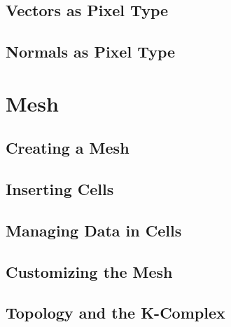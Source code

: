 




\subsection{Vectors as Pixel Type}
\label{sec:PointSetWithVectorsAsPixelType}





\subsection{Normals as Pixel Type}
\label{sec:PointSetWithCovariantVectorsAsPixelType}






\section{Mesh}\label{MeshSection}

\subsection{Creating a Mesh}
\label{sec:CreatingAMesh}




\subsection{Inserting Cells}
\label{sec:InsertingCellsInMesh}




\subsection{Managing Data in Cells}
\label{sec:ManagingCellDataInMesh}




\subsection{Customizing the Mesh}
\label{sec:CustomizingTheMesh}




\subsection{Topology and the K-Complex}
\label{sec:MeshKComplex}

